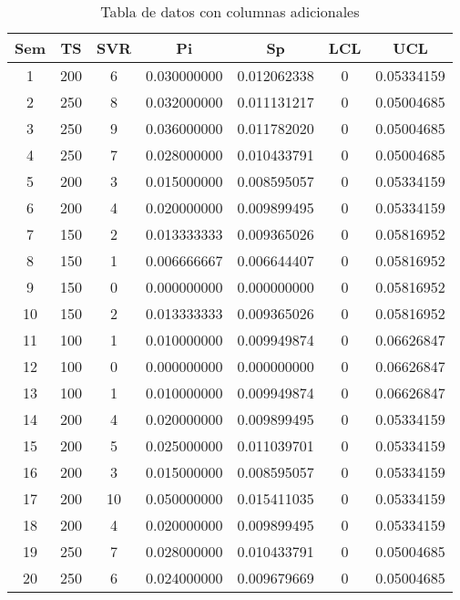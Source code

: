 \documentclass{article}
\begin{document}
\begin{table}[h]
    \centering
    \begin{adjustbox}{width= 0.8\textwidth}
    \begin{tabular}{ccccccc}
        \toprule
        \textbf{Sem} & \textbf{TS} & \textbf{SVR} & \textbf{Pi} & \textbf{Sp} & \textbf{LCL} & \textbf{UCL} \\
        \midrule
         1  & 200 &  6 & 0.030000000 & 0.012062338 & 0 & 0.05334159 \\
         2  & 250 &  8 & 0.032000000 & 0.011131217 & 0 & 0.05004685 \\
         3  & 250 &  9 & 0.036000000 & 0.011782020 & 0 & 0.05004685 \\
         4  & 250 &  7 & 0.028000000 & 0.010433791 & 0 & 0.05004685 \\
         5  & 200 &  3 & 0.015000000 & 0.008595057 & 0 & 0.05334159 \\
         6  & 200 &  4 & 0.020000000 & 0.009899495 & 0 & 0.05334159 \\
         7  & 150 &  2 & 0.013333333 & 0.009365026 & 0 & 0.05816952 \\
         8  & 150 &  1 & 0.006666667 & 0.006644407 & 0 & 0.05816952 \\
         9  & 150 &  0 & 0.000000000 & 0.000000000 & 0 & 0.05816952 \\
        10  & 150 &  2 & 0.013333333 & 0.009365026 & 0 & 0.05816952 \\
        11  & 100 &  1 & 0.010000000 & 0.009949874 & 0 & 0.06626847 \\
        12  & 100 &  0 & 0.000000000 & 0.000000000 & 0 & 0.06626847 \\
        13  & 100 &  1 & 0.010000000 & 0.009949874 & 0 & 0.06626847 \\
        14  & 200 &  4 & 0.020000000 & 0.009899495 & 0 & 0.05334159 \\
        15  & 200 &  5 & 0.025000000 & 0.011039701 & 0 & 0.05334159 \\
        16  & 200 &  3 & 0.015000000 & 0.008595057 & 0 & 0.05334159 \\
        17  & 200 & 10 & 0.050000000 & 0.015411035 & 0 & 0.05334159 \\
        18  & 200 &  4 & 0.020000000 & 0.009899495 & 0 & 0.05334159 \\
        19  & 250 &  7 & 0.028000000 & 0.010433791 & 0 & 0.05004685 \\
        20  & 250 &  6 & 0.024000000 & 0.009679669 & 0 & 0.05004685 \\
        \bottomrule
    \end{tabular}
    \end{adjustbox}
    \caption{Tabla de datos con columnas adicionales}
    \label{tab:datos_completa}
\end{table}
\end{document}
